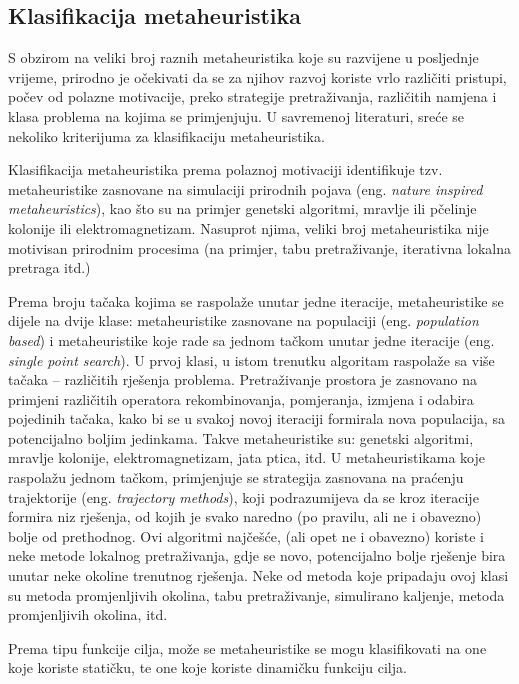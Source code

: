 \documentclass[a4paper, utf8, 11pt, colorlinks]{book}
\theoremstyle{definition}
\begin{document}
 \subsection{Klasifikacija metaheuristika}
 S obzirom na veliki broj raznih metaheuristika koje su razvijene u posljednje vrijeme, prirodno je očekivati da se za  njihov razvoj koriste vrlo različiti pristupi, počev od polazne motivacije, preko strategije pretraživanja, različitih namjena i klasa problema na kojima se primjenjuju.
 U savremenoj literaturi, sreće se nekoliko kriterijuma za klasifikaciju metaheuristika.
 
 Klasifikacija metaheuristika prema polaznoj motivaciji identifikuje tzv. metaheuristike zasnovane na simulaciji prirodnih pojava (eng. \emph{nature inspired metaheuristics}), kao što su na primjer genetski algoritmi, mravlje ili pčelinje kolonije ili elektromagnetizam. Nasuprot njima, veliki broj metaheuristika nije motivisan prirodnim procesima (na primjer, tabu pretraživanje, iterativna lokalna pretraga itd.)
 
 Prema broju tačaka kojima se raspolaže unutar jedne iteracije, metaheuristike se dijele na dvije klase: metaheuristike zasnovane na populaciji (eng. \emph{population based}) i metaheuristike koje rade sa jednom tačkom unutar jedne iteracije (eng. \emph{single point search}). U prvoj klasi, u istom trenutku algoritam raspolaže sa više tačaka -- različitih rješenja problema. Pretraživanje prostora je zasnovano na primjeni različitih operatora rekombinovanja, pomjeranja, izmjena i odabira pojedinih tačaka, kako bi se u svakoj novoj iteraciji formirala nova populacija, sa potencijalno boljim jedinkama. Takve metaheuristike su: genetski algoritmi, mravlje kolonije, elektromagnetizam, jata ptica, itd.
 U metaheuristikama koje raspolažu jednom tačkom, primjenjuje se strategija zasnovana na praćenju trajektorije (eng. \emph{trajectory methods}), koji podrazumijeva da se kroz iteracije formira niz rješenja, od kojih je svako naredno (po pravilu, ali ne i obavezno) bolje od prethodnog. Ovi algoritmi najčešće, (ali opet ne i obavezno) koriste i neke metode lokalnog pretraživanja, gdje se novo, potencijalno bolje rješenje bira unutar neke okoline trenutnog rješenja. Neke od metoda koje pripadaju ovoj klasi su metoda promjenljivih okolina, tabu pretraživanje, simulirano kaljenje, metoda promjenljivih okolina, itd.
 
 Prema tipu funkcije cilja, može se  metaheuristike se mogu klasifikovati na one koje koriste statičku, te one koje koriste dinamičku funkciju cilja.
 
\end{document}
